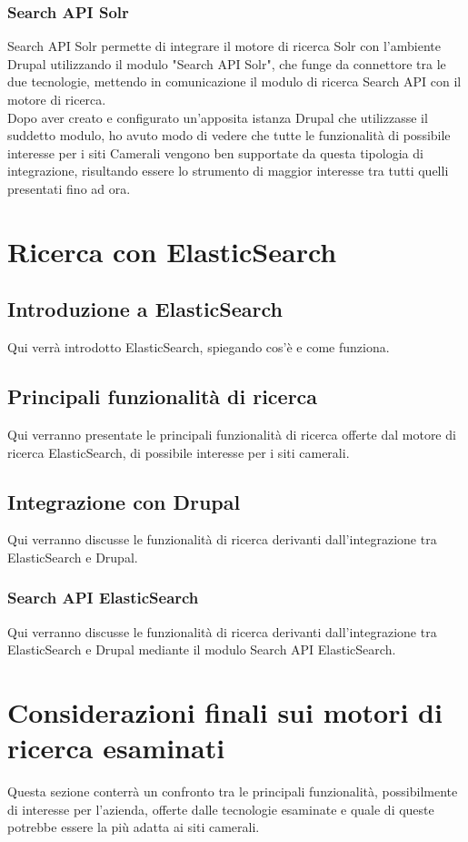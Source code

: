 			\subsubsection{Search API Solr}
			Search API Solr permette di integrare il motore di ricerca \gls{Solr} con l'ambiente \gls{Drupal} utilizzando il modulo "Search API Solr", che funge da connettore tra le due tecnologie, mettendo in comunicazione il modulo di ricerca \gls{Search API} con il motore di ricerca. \\
			Dopo aver creato e configurato un'apposita istanza \gls{Drupal} che utilizzasse il suddetto modulo, ho avuto modo di vedere che tutte le funzionalità di possibile interesse per i siti Camerali vengono ben supportate da questa tipologia di integrazione, risultando essere lo strumento di maggior interesse tra tutti quelli presentati fino ad ora.
	
	\section{Ricerca con ElasticSearch}
	
		\subsection{Introduzione a ElasticSearch}
		Qui verrà introdotto ElasticSearch, spiegando cos'è e come funziona.

		\subsection{Principali funzionalità di ricerca}
		Qui verranno presentate le principali funzionalità di ricerca offerte dal motore di ricerca ElasticSearch, di possibile interesse per i siti camerali.
		
		\subsection{Integrazione con Drupal}
		Qui verranno discusse le funzionalità di ricerca derivanti dall'integrazione tra ElasticSearch e Drupal.
		
			\subsubsection{Search API ElasticSearch}
			Qui verranno discusse le funzionalità di ricerca derivanti dall'integrazione tra ElasticSearch e Drupal mediante il modulo Search API ElasticSearch.
			
	\section{Considerazioni finali sui motori di ricerca esaminati}
	Questa sezione conterrà un confronto tra le principali funzionalità, possibilmente di interesse per l'azienda, offerte dalle tecnologie esaminate e quale di queste potrebbe essere la più adatta ai siti camerali.